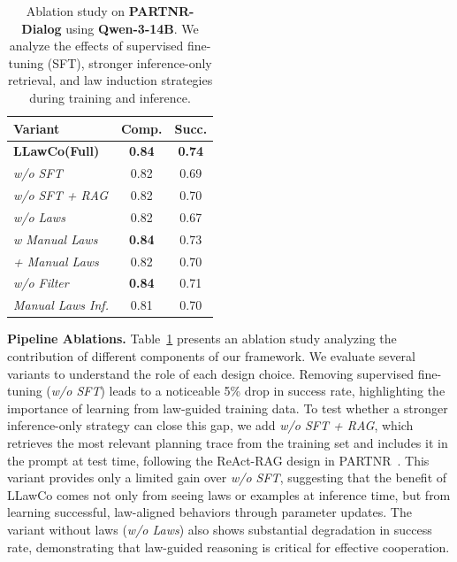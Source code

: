 \documentclass{article}
\theoremstyle{plain}
\theoremstyle{definition}
\theoremstyle{remark}
\newcommand{\name}{LLawCo\xspace}
\begin{document}
\begin{table}[t]
\centering
\setlength{\tabcolsep}{5pt}
\caption{Ablation study on \textbf{PARTNR-Dialog} using \textbf{Qwen-3-14B}. We analyze the effects of supervised fine-tuning (SFT), stronger inference-only retrieval, and law induction strategies during training and inference.}
\label{tab:partnr-ablation}
\begin{tabular}{l|cc}
\toprule
\textbf{Variant} & \textbf{Comp.} & \textbf{Succ.} \\
\midrule
\textbf{\name (Full)} 
& \textbf{0.84} 
& \textbf{0.74}\\

\textit{w/o SFT} 
& 0.82 
& 0.69 \\

\textit{w/o SFT + RAG}
& 0.82
& 0.70 \\

\textit{w/o Laws} 
& 0.82 
& 0.67 \\

\textit{w Manual Laws} 
& \textbf{0.84}
& 0.73 \\

\textit{+ Manual Laws} 
& 0.82 
& 0.70 \\

\textit{w/o Filter} 
& \textbf{0.84} 
& 0.71 \\


\textit{Manual Laws Inf.} 
& 0.81 
& 0.70 \\

\bottomrule
\end{tabular}
\end{table}
\textbf{Pipeline Ablations.}
Table~\ref{tab:partnr-ablation} presents an ablation study analyzing the contribution of different components of our framework. We evaluate several variants to understand the role of each design choice. Removing supervised fine-tuning (\textit{w/o SFT}) leads to a noticeable 5\% drop in success rate, highlighting the importance of learning from law-guided training data. To test whether a stronger inference-only strategy can close this gap, we add \textit{w/o SFT + RAG}, which retrieves the most relevant planning trace from the training set and includes it in the prompt at test time, following the ReAct-RAG design in PARTNR~\cite{partnr}. This variant provides only a limited gain over \textit{w/o SFT}, suggesting that the benefit of \name comes not only from seeing laws or examples at inference time, but from learning successful, law-aligned behaviors through parameter updates. The variant without laws (\textit{w/o Laws}) also shows substantial degradation in success rate, demonstrating that law-guided reasoning is critical for effective cooperation.
\end{document}
